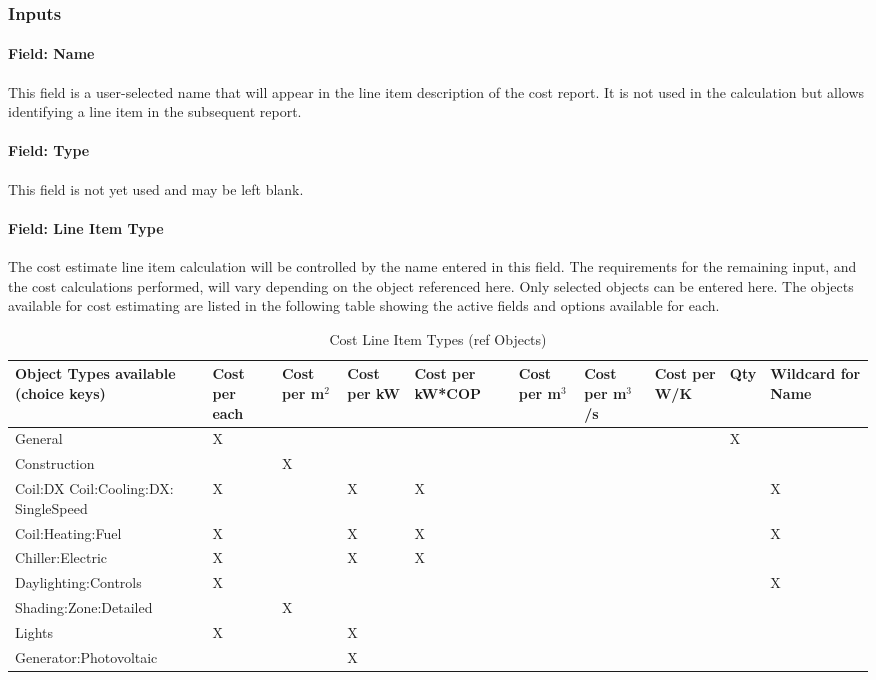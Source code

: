 \subsubsection{Inputs}

\paragraph{Field: Name}\label{componentcostlineitem-field-name}

This field is a user-selected name that will appear in the line item description of the cost report. It is not used in the calculation but allows identifying a line item in the subsequent report.

\paragraph{Field: Type}\label{field-type}

This field is not yet used and may be left blank.

\paragraph{Field: Line Item Type}\label{field-line-item-type}

The cost estimate line item calculation will be controlled by the name entered in this field. The requirements for the remaining input, and the cost calculations performed, will vary depending on the object referenced here. Only selected objects can be entered here. The objects available for cost estimating are listed in the following table showing the active fields and options available for each.

\begin{longtable}[c]{p{1.4in}p{0.4in}p{0.4in}p{0.5in}p{0.5in}p{0.4in}p{0.4in}p{0.4in}p{0.4in}p{0.5in}}
\caption{Cost Line Item Types (ref Objects) \label{table:cost-line-item-types-ref-objects}} \tabularnewline
\toprule
Object Types available (choice keys) & Cost per each & Cost per m\(^{2}\) & Cost per kW & Cost per kW*COP & Cost per m\(^{3}\) & Cost per m\(^{3}\)/s & Cost per W/K & Qty & Wildcard for Name \tabularnewline
\midrule
\endhead

General & X & ~ & ~ & ~ & ~ & ~ & ~ & X & ~ \tabularnewline
\hline
Construction & ~ & X & ~ & ~ & ~ & ~ & ~ & ~ & ~ \tabularnewline
\hline
Coil:DX Coil:Cooling:DX: SingleSpeed & X & ~ & X & X & ~ & ~ & ~ & ~ & X \tabularnewline
\hline
Coil:Heating:Fuel & X & ~ & X & X & ~ & ~ & ~ & ~ & X \tabularnewline
\hline
Chiller:Electric & X & ~ & X & X & ~ & ~ & ~ & ~ & ~ \tabularnewline
\hline
Daylighting:Controls & X & ~ & ~ & ~ & ~ & ~ & ~ & ~ & X \tabularnewline
\hline
Shading:Zone:Detailed & ~ & X & ~ & ~ & ~ & ~ & ~ & ~ & ~ \tabularnewline
\hline
Lights & X & ~ & X & ~ & ~ & ~ & ~ & ~ & ~ \tabularnewline
\hline
Generator:Photovoltaic & ~ & ~ & X & ~ & ~ & ~ & ~ & ~ & ~ \tabularnewline
\bottomrule
\end{longtable}

